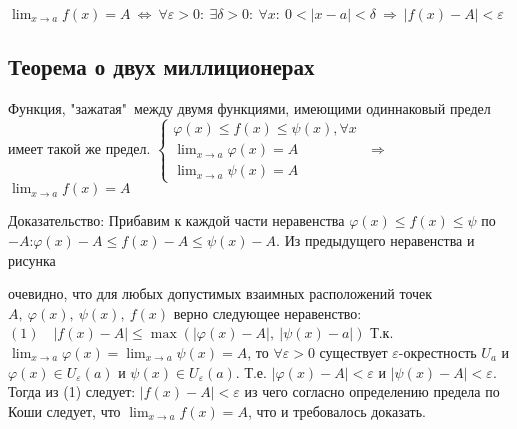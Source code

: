 $\displaystyle \lim_{x \to a} f(x) = A \ \Leftrightarrow \ \forall \varepsilon > 0 : \ \exists \delta > 0: \ \forall x : \ 0 < |x - a| < \delta \ \Rightarrow \ |f(x) - A| < \varepsilon $\newline

\subsection{Теорема о двух миллиционерах}
Функция, "зажатая"\ между двумя функциями, имеющими одиннаковый предел имеет такой же предел.\newline
$\begin{cases}\varphi(x) \leq f(x) \leq \psi(x), \forall x \\ \displaystyle \lim_{x \to a} \varphi(x) = A
\\ \displaystyle \lim_{x \to a} \psi(x) = A\end{cases}$ $\Longrightarrow$ \qquad $\displaystyle \lim_{x \to a} f(x) = A$\newline\newline

Доказательство:\newline
Прибавим к каждой части неравенства $\varphi(x) \leq f(x) \leq \psi$ по $-A$:\newline $\varphi(x) - A \leq f(x) - A \leq \psi(x) - A$. Из предыдущего неравенства и рисунка\newline 
 \begin{center}
 \end{center}
  очевидно, что для любых допустимых взаимных расположений точек $A,\  \varphi(x),\  \psi(x),\  f(x)$ верно следующее неравенство:\newline
$(1)\quad |f(x) - A| \leq \max(|\varphi(x) - A|,\ |\psi(x) - a|)$\newline
Т.к. $\displaystyle \lim_{x \to a} \varphi(x) = \lim_{x \to a} \psi(x) = A$, то $\forall \varepsilon > 0$ существует $\varepsilon$-окрестность $U_a$ и\newline
$\varphi(x) \in U_{\varepsilon}(a)$ и $\psi(x) \in U_{\varepsilon}(a)$. Т.е. $|\varphi(x) - A| < \varepsilon$ и $|\psi(x) - A| < \varepsilon$.\newline
Тогда из (1) следует: $|f(x) - A| < \varepsilon$ из чего согласно определению предела по Коши следует, что $\displaystyle \lim_{x \to a} f(x) = A$, что и требовалось доказать.

